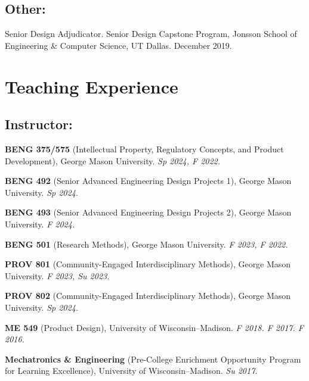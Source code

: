 \documentclass[letterpaper, 10pt]{article}
\begin{document}
\subsection{Other:}
\begin{compactenum}
    \item Senior Design Adjudicator. Senior Design Capstone Program, Jonsson School of Engineering \& Computer Science, UT Dallas. December 2019.
\end{compactenum}

\section{Teaching Experience}

\subsection{Instructor:}

\begin{compactitem}
     \item \textbf{BENG 375/575} (Intellectual Property, Regulatory Concepts, and Product Development), George Mason University. \textit{Sp 2024, F 2022.}
     \item \textbf{BENG 492} (Senior Advanced Engineering Design Projects 1), George Mason University. \textit{Sp 2024.}
     \item \textbf{BENG 493} (Senior Advanced Engineering Design Projects 2), George Mason University. \textit{F 2024.}
     \item \textbf{BENG 501} (Research Methods), George Mason University. \textit{F 2023, F 2022.}
     \item \textbf{PROV 801} (Community-Engaged Interdisciplinary Methods), George Mason University. \textit{F 2023, Su 2023.}
     \item \textbf{PROV 802} (Community-Engaged Interdisciplinary Methods), George Mason University. \textit{Sp 2024.}
     \item \textbf{ME 549} (Product Design), University of Wisconsin--Madison. \textit{F 2018. F 2017. F 2016.}
     \item \textbf{Mechatronics \& Engineering} (Pre-College Enrichment Opportunity Program for Learning Excellence), University of Wisconsin--Madison. \textit{Su 2017.}
\end{compactitem}
\end{document}
